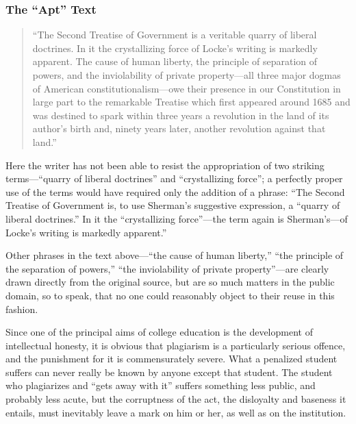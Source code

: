 \subsubsection{The “Apt” Text}

\begin{quote}
“The Second Treatise of Government is a veritable quarry of liberal doctrines. In it the crystallizing force of Locke’s writing is markedly apparent. The cause of human liberty, the principle of separation of powers, and the inviolability of private property—all three major dogmas of American constitutionalism—owe their presence in our Constitution in large part to the remarkable Treatise which first appeared around 1685 and was destined to spark within three years a revolution in the land of its author’s birth and, ninety years later, another revolution against that land.”
\end{quote}

Here the writer has not been able to resist the appropriation of two striking terms—“quarry of liberal doctrines” and “crystallizing force”; a perfectly proper use of the terms would have required only the addition of a phrase: “The Second Treatise of Government is, to use Sherman’s suggestive expression, a “quarry of liberal doctrines.” In it the “crystallizing force”—the term again is Sherman’s—of Locke’s writing is markedly apparent.”

Other phrases in the text above—“the cause of human liberty,” “the principle of the separation of powers,” “the inviolability of private property”—are clearly drawn directly from the original source, but are so much matters in the public domain, so to speak, that no one could reasonably object to their reuse in this fashion.

Since one of the principal aims of college education is the development of intellectual honesty, it is obvious that plagiarism is a particularly serious offence, and the punishment for it is commensurately severe. What a penalized student suffers can never really be known by anyone except that student. The student who plagiarizes and “gets away with it” suffers something less public, and probably less acute, but the corruptness of the act, the disloyalty and baseness it entails, must inevitably leave a mark on him or her, as well as on the institution.
